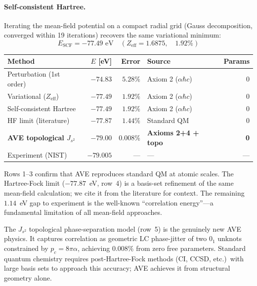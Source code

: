 \paragraph{Self-consistent Hartree.}
Iterating the mean-field potential on a compact radial grid (Gauss decomposition, converged within 19 iterations) recovers the same variational minimum:
\begin{equation}
    E_\text{SCF} = -77.49 \text{ eV} \quad (Z_\text{eff} = 1.6875, \quad 1.92\%)
\end{equation}

\begin{center}
\small
\renewcommand{\arraystretch}{1.2}
\begin{tabular}{lrrlr}
\toprule
\textbf{Method} & \textbf{$E$ [eV]} & \textbf{Error} & \textbf{Source} & \textbf{Params} \\
\midrule
Perturbation (1st order) & $-74.83$ & $5.28\%$ & Axiom 2 ($\alpha\hbar c$) & 0 \\
Variational ($Z_\text{eff}$) & $-77.49$ & $1.92\%$ & Axiom 2 ($\alpha\hbar c$) & 0 \\
Self-consistent Hartree & $-77.49$ & $1.92\%$ & Axiom 2 ($\alpha\hbar c$) & 0 \\
\midrule
HF limit (literature) & $-77.87$ & $1.44\%$ & Standard QM & 0 \\
\midrule
\textbf{AVE topological $J_{s^2}$} & $\mathbf{-79.00}$ & $\mathbf{0.008\%}$ & \textbf{Axioms 2+4 + topo} & \textbf{0} \\
Experiment (NIST) & $-79.005$ & --- & --- & --- \\
\bottomrule
\end{tabular}
\end{center}

\noindent
Rows 1--3 confirm that AVE reproduces standard QM at atomic scales.  The Hartree-Fock limit ($-77.87$~eV, row~4) is a basis-set refinement of the same mean-field calculation; we cite it from the literature for context.  The remaining $1.14$~eV gap to experiment is the well-known ``correlation energy''---a fundamental limitation of all mean-field approaches.

The $J_{s^2}$ topological phase-separation model (row~5) is the genuinely new AVE physics. It captures correlation as geometric LC phase-jitter of two $0_1$ unknots constrained by $p_c = 8\pi\alpha$, achieving $0.008\%$ from zero free parameters.  Standard quantum chemistry requires post-Hartree-Fock methods (CI, CCSD, etc.)\ with large basis sets to approach this accuracy; AVE achieves it from structural geometry alone.

